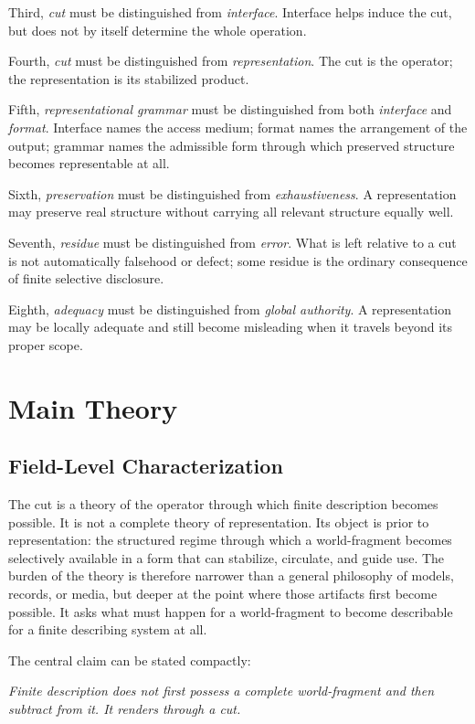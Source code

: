 \documentclass[11pt]{article}
\renewenvironment{quote}
  {\list{}{\leftmargin=1.4em \rightmargin=1.0em}%
   \item\relax\color{softink}\itshape}
  {\endlist}
\renewcommand{\emph}[1]{\textit{#1}}
\begin{document}
Third, \emph{cut} must be distinguished from \emph{interface}. Interface helps induce the cut, but does not by itself determine the whole operation.

Fourth, \emph{cut} must be distinguished from \emph{representation}. The cut is the operator; the representation is its stabilized product.

Fifth, \emph{representational grammar} must be distinguished from both \emph{interface} and \emph{format}. Interface names the access medium; format names the arrangement of the output; grammar names the admissible form through which preserved structure becomes representable at all.

Sixth, \emph{preservation} must be distinguished from \emph{exhaustiveness}. A representation may preserve real structure without carrying all relevant structure equally well.

Seventh, \emph{residue} must be distinguished from \emph{error}. What is left relative to a cut is not automatically falsehood or defect; some residue is the ordinary consequence of finite selective disclosure.

Eighth, \emph{adequacy} must be distinguished from \emph{global authority}. A representation may be locally adequate and still become misleading when it travels beyond its proper scope.
\section{Main Theory}

\subsection{Field-Level Characterization}

The cut is a theory of the operator through which finite description becomes possible. It is not a complete theory of representation. Its object is prior to representation: the structured regime through which a world-fragment becomes selectively available in a form that can stabilize, circulate, and guide use. The burden of the theory is therefore narrower than a general philosophy of models, records, or media, but deeper at the point where those artifacts first become possible. It asks what must happen for a world-fragment to become describable for a finite describing system at all.

The central claim can be stated compactly:

\begin{quote}
Finite description does not first possess a complete world-fragment and then subtract from it. It renders through a cut.
\end{quote}
\end{document}
